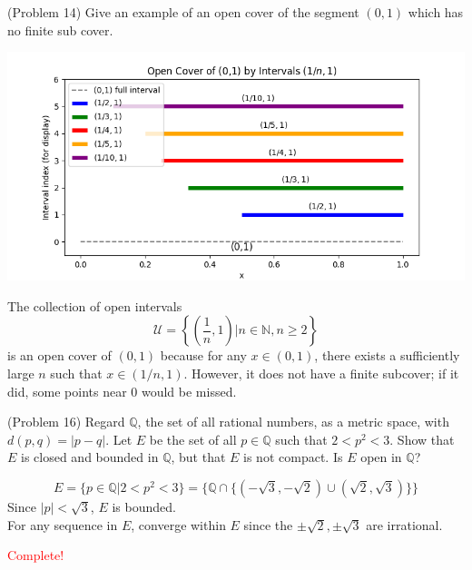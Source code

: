 \documentclass[12pt]{exam}
\begin{document}
\begin{questions}
\question[] (Problem 14) Give an example of an open cover of the segment \((0,1)\) which has no finite sub cover. 

\begin{solution}

    \includegraphics[scale=0.5]{figures/Figure_1.png}


    The collection of open intervals \[\mathcal{U} = \left\{\left(\dfrac{1}{n},1\right)|n \in \mathbb{N}, n \geq 2\right\}\]
is an open cover of \((0,1)\) because for any \(x \in (0,1)\), there exists a sufficiently large \(n\) such that \(x \in (1/n,1)\). However, it does not have a finite subcover; if it did, some points near 0 would be missed. 
\end{solution}

\question[] (Problem 16) Regard \(\mathbb{Q}\), the set of all rational numbers, as a metric space, with \(d(p,q)=|p-q|\). Let \(E\) be the set of all \(p\in \mathbb{Q}\) such that \(2<p^2<3\). Show that \(E\) is closed and bounded in \(\mathbb{Q}\), but that \(E\) is not compact. Is \(E\) open in \(\mathbb{Q}\)? 

\begin{solution}
    \[E = \{p \in \mathbb{Q}| 2 < p^2<3\} = \{\mathbb{Q} \cap \{(-\sqrt{3}, -\sqrt{2}) \cup (\sqrt{2}, \sqrt{3})\}\}\] 
    Since \(|p|< \sqrt{3}\), \(E\) is bounded. \\
For any sequence in \(E\), converge within \(E\) since the \(\pm \sqrt{2}, \pm \sqrt{3}\) are irrational. 

\textcolor{red}{Complete!}

\end{solution}







\end{questions}
\end{document}
